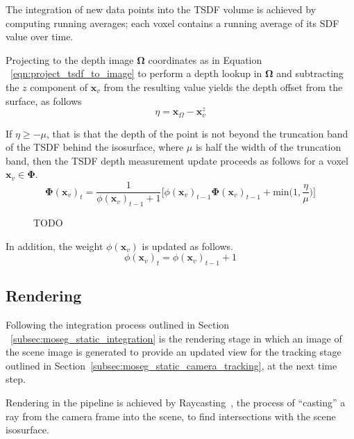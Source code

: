 The integration of new data points into the TSDF volume is achieved by computing 
running averages; each voxel contains a running average of its SDF value over
time.

Projecting to the depth image \(\bm{\Omega}\) coordinates as in Equation
~\ref{eqn:project_tsdf_to_image} to perform a depth lookup in \(\bm{\Omega}\)
and subtracting the \(z\) component of \(\bm{x}_{v}\) from the resulting value
yields the depth offset from the surface, as follows
\begin{equation}
  \label{eqn:integration_offset}
  \eta = \bm{x}_{\Omega} - \bm{x}_{v}^{z}
\end{equation}

If \(\eta \geq -\mu\), that is that the depth of the point is not beyond the
truncation band of the TSDF behind the isosurface, where \(\mu\) is half the 
width of the truncation band, then the TSDF depth measurement update 
proceeds as follows for a voxel \(\bm{x}_{v} \in \bm{\Phi}\).
\begin{equation}
\label{eqn:sdf_update}
\bm{\Phi}(\bm{x}_{v})_{t} = \frac{1}{\phi(\bm{x}_{v})_{t-1} + 1}
\bigg[\phi(\bm{x}_{v})_{t-1}\bm{\bm{\Phi}}(\bm{x}_{v})_{t-1} +
\text{min} \bigg( 1, \frac{\eta}{\mu} \bigg)
\bigg]
\end{equation}

\begin{figure}[h]
  \label{fig:truncation_band}
  \caption{TODO}
\end{figure}

In addition, the weight \(\phi(\bm{x}_{v})\) is updated as follows.
\begin{equation}
  \label{eqn:sdf_weight_update}
  \phi(\bm{x}_{v})_{t} = \phi(\bm{x}_{v})_{t-1} + 1
\end{equation}

\subsection{Rendering}
\label{subsec:moseg_static_rendering}
Following the integration process outlined in Section
~\ref{subsec:moseg_static_integration} is the rendering stage in which an image
of the scene image is generated to provide an updated view for the tracking
stage outlined in Section~\ref{subsec:moseg_static_camera_tracking}, at the next
time step.

Rendering in the pipeline is achieved by Raycasting~\cite{RAYCAST}, the process of 
``casting'' a ray from the camera frame into the scene, to find intersections with 
the scene isosurface. 

